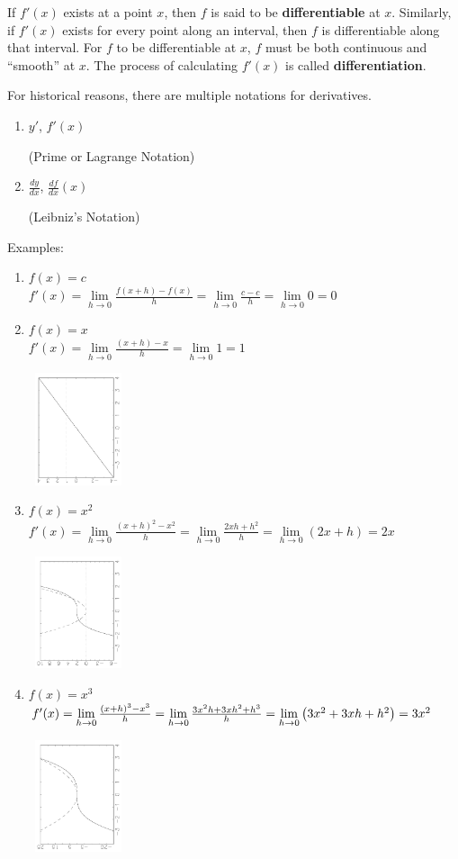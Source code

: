 \documentclass[11pt]{article}
\newcommand{\be}{\begin{enumerate}}
\newcommand{\ee}{\end{enumerate}}
\newcommand{\llim}{\lim\limits}
\newcommand{\pb}{\parbox{1in}}
\newcommand{\pbt}{\parbox[t]{2in}}
\newcommand{\pbff}{\parbox[t]{4in}}
\begin{document}
\item If $f'(x)$ exists at a point $x$, then $f$ is said to be {\bf
differentiable} at $x$.  Similarly, if $f'(x)$ exists for every point
along an interval, then $f$ is differentiable along that interval.  For
$f$ to be differentiable at $x$, $f$ must be both continuous and
``smooth'' at $x$.  The process of calculating $f'(x)$ is called {\bf
differentiation}.

\item For historical reasons, there are multiple notations for
  derivatives.  
  \be
  \item \pbt{$y'$, $f'(x)$} (Prime or Lagrange Notation)
    \item \pbt{$\frac{dy}{dx}$, $\frac{df}{dx}(x)$} (Leibniz's Notation)
  \ee

\item Examples:
  \be
  \item $f(x)=c$\\
   $f'(x)=\llim_{h\to 0} \frac{f(x+h)-f(x)}{h}
   =\llim_{h\to 0} \frac{c-c}{h}
   =\llim_{h\to 0} 0 = 0$
  \item \pbff{$f(x)=x$\\
   $f'(x)=\llim_{h\to 0} \frac{(x+h)-x}{h}
   =\llim_{h\to 0} 1 = 1$}
   \pb{\,  {\includegraphics[width=1in, angle = 270]{derivxJ}}}
  \item \pbff{$f(x)=x^2$\\
   $f'(x)=\llim_{h\to 0} \frac{(x+h)^2-x^2}{h}
   =\llim_{h\to 0}\frac{2xh+h^2}{h}
   =\llim_{h\to 0} (2x + h) = 2x$}
   \pb{\,  {\includegraphics[width=1in, angle = 270]{derivx2J}}}
  \item \pbff{$f(x)=x^3$\\
   $f'(x) = \llim_{h\to 0}\frac{(x+h)^3-x^3}{h}
   = \llim_{h\to 0}\frac{3x^2 h +3xh^2 + h^3}{h}\\
   = \llim_{h\to 0}\left(3x^2 + 3xh+h^2\right)
   = 3x^2$}
   \pb{\,  {\includegraphics[width=1in, angle = 270]{derivx3J}}}
  \ee
\end{document}
